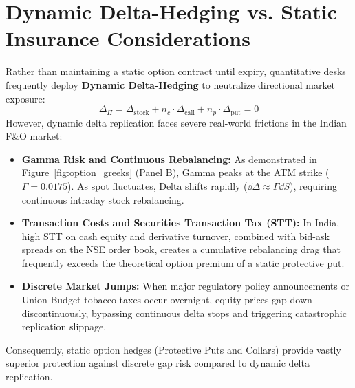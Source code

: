 \section{Dynamic Delta-Hedging vs. Static Insurance Considerations}
\label{sec:dynamic_delta_hedging}

Rather than maintaining a static option contract until expiry, quantitative desks frequently deploy \textbf{Dynamic Delta-Hedging} to neutralize directional market exposure:
\begin{equation}
\Delta_{\Pi} = \Delta_{\text{stock}} + n_c \cdot \Delta_{\text{call}} + n_p \cdot \Delta_{\text{put}} = 0
\end{equation}
However, dynamic delta replication faces severe real-world frictions in the Indian F\&O market:
\begin{itemize}
    \item \textbf{Gamma Risk and Continuous Rebalancing:} As demonstrated in Figure~\ref{fig:option_greeks} (Panel B), Gamma peaks at the ATM strike ($\Gamma = 0.0175$). As spot fluctuates, Delta shifts rapidly ($\dd \Delta \approx \Gamma \dd S$), requiring continuous intraday stock rebalancing.
    \item \textbf{Transaction Costs and Securities Transaction Tax (STT):} In India, high STT on cash equity and derivative turnover, combined with bid-ask spreads on the NSE order book, creates a cumulative rebalancing drag that frequently exceeds the theoretical option premium of a static protective put.
    \item \textbf{Discrete Market Jumps:} When major regulatory policy announcements or Union Budget tobacco taxes occur overnight, equity prices gap down discontinuously, bypassing continuous delta stops and triggering catastrophic replication slippage.
\end{itemize}
Consequently, static option hedges (Protective Puts and Collars) provide vastly superior protection against discrete gap risk compared to dynamic delta replication.
